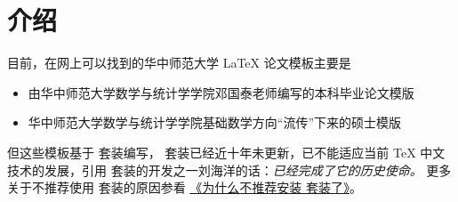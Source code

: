 \documentclass{ccnudoc}
\begin{document}
\thispagestyle{plain}
\clearpage




\tableofcontents



\section{介绍} 

目前，在网上可以找到的华中师范大学 \LaTeX{} 论文模板主要是

\begin{itemize}
  \item 由华中师范大学数学与统计学学院邓国泰老师编写的本科毕业论文模版
  \item 华中师范大学数学与统计学学院基础数学方向“流传”下来的硕士模版
\end{itemize}

但这些模板基于 \CTeX 套装编写， \CTeX 套装已经近十年未更新，已不能适应当前 \TeX{} 中文技术的发展，引用 \CTeX 套装的开发之一刘海洋的话：\emph{\CTeX 已经完成了它的历史使命。} 更多关于不推荐使用 \CTeX 套装的原因参看 \href{https://gitee.com/xkwxdyy/CCNUthesis/wikis/%E5%B8%B8%E8%A7%81%E9%97%AE%E9%A2%98FAQ/%E4%B8%BA%E4%BB%80%E4%B9%88%E4%B8%8D%E6%8E%A8%E8%8D%90%E5%AE%89%E8%A3%85\CTeX%E5%A5%97%E8%A3%85%E4%BA%86}{《为什么不推荐安装 \CTeX 套装了》}。
\end{document}
